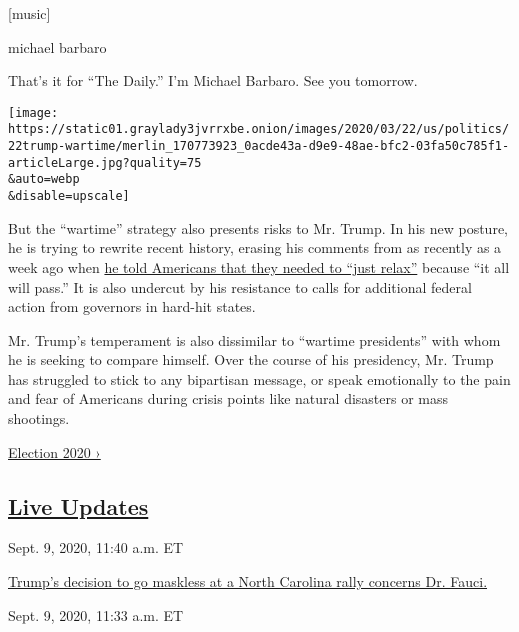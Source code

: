 {[}music{]}

michael barbaro

That's it for ``The Daily.'' I'm Michael Barbaro. See you tomorrow.

\texttt{[image: https://static01.graylady3jvrrxbe.onion/images/2020/03/22/us/politics/22trump-wartime/merlin\_170773923\_0acde43a-d9e9-48ae-bfc2-03fa50c785f1-articleLarge.jpg?quality=75\\\&auto=webp\\\&disable=upscale]}

But the ``wartime'' strategy also presents risks to Mr. Trump. In his
new posture, he is trying to rewrite recent history, erasing his
comments from as recently as a week ago when
\href{https://www.nytimes3xbfgragh.onion/2020/03/15/us/politics/trump-flynn-pardon.html}{he
told Americans that they needed to ``just relax''} because ``it all will
pass.'' It is also undercut by his resistance to calls for additional
federal action from governors in hard-hit states.

Mr. Trump's temperament is also dissimilar to ``wartime presidents''
with whom he is seeking to compare himself. Over the course of his
presidency, Mr. Trump has struggled to stick to any bipartisan message,
or speak emotionally to the pain and fear of Americans during crisis
points like natural disasters or mass shootings.

\href{https://www.nytimes3xbfgragh.onion/news-event/2020-election}{Election
2020 ›}

\hypertarget{live-updates}{%
\subsection{\texorpdfstring{\href{https://www.nytimes3xbfgragh.onion/live/2020/09/09/us/trump-vs-biden}{Live
Updates}}{Live Updates}}\label{live-updates}}

\href{https://www.nytimes3xbfgragh.onion/live/2020/09/09/us/trump-vs-biden\#trumps-decision-to-go-maskless-at-a-north-carolina-rally-concerns-dr-fauci}{}

Sept. 9, 2020, 11:40 a.m. ET

\href{https://www.nytimes3xbfgragh.onion/live/2020/09/09/us/trump-vs-biden\#trumps-decision-to-go-maskless-at-a-north-carolina-rally-concerns-dr-fauci}{Trump's
decision to go maskless at a North Carolina rally concerns Dr.
Fauci.}\href{https://www.nytimes3xbfgragh.onion/live/2020/09/09/us/trump-vs-biden\#the-go-to-republican-election-lawyer-called-trumps-claims-of-voting-fraud-unsustainable}{}

Sept. 9, 2020, 11:33 a.m. ET

